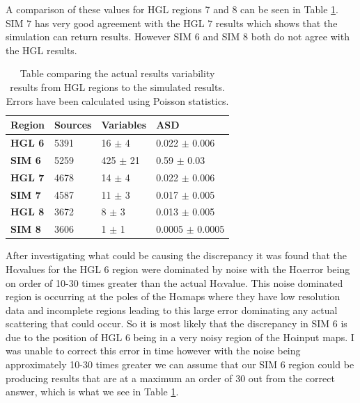 \documentclass[a4paper]{article}
\def\halpha{$\mathrm{H\alpha}$\;}
\begin{document}
A comparison of these values for HGL regions 7 and 8 can be seen in Table \ref{tab:HGLcomp}. SIM 7 has very good agreement with the HGL 7 results which shows that the simulation can return results. However SIM 6 and SIM 8 both do not agree with the HGL results. 
\begin{table}[H]
    \centering
\begin{tabular}{llll}
    \toprule
    \textbf{Region}	& \textbf{Sources}	&	\textbf{Variables}	&		\textbf{ASD}		\\ \midrule
    \textbf{HGL 6}	&   5391 &	16 $\pm$ 4  &	0.022 $\pm$ 0.006	\\
    \textbf{SIM 6}	&	5259 &  425 $\pm$ 21&	0.59  $\pm$ 0.03	\\\midrule
    \textbf{HGL 7}	&	4678 &	14 $\pm$ 4	&	0.022 $\pm$ 0.006	\\
    \textbf{SIM 7}	&	4587 &	11 $\pm$ 3	&	0.017 $\pm$ 0.005	\\\midrule
    \textbf{HGL 8}	&	3672 &	8 $\pm$ 3 	&	0.013 $\pm$ 0.005	\\
    \textbf{SIM 8}	&   3606 &	1 $\pm$ 1	&	0.0005 $\pm$ 0.0005	\\\bottomrule
\end{tabular}
    \caption{Table comparing the actual results variability results from HGL regions to the simulated results. Errors have been calculated using Poisson statistics.}
    \label{tab:HGLcomp}
\end{table}

After investigating what could be causing the discrepancy it was found that the \halpha values for the HGL 6 region were dominated by noise with the \halpha error being on order of 10-30 times greater than the actual \halpha value. This noise dominated region is occurring at the poles of the \halpha maps where they have low resolution data and incomplete regions leading to this large error dominating any actual scattering that could occur. So it is most likely that the discrepancy in SIM 6 is due to the position of HGL 6 being in a very noisy region of the \halpha input maps. I was unable to correct this error in time however with the noise being approximately 10-30 times greater we can assume that our SIM 6 region could be producing results that are at a maximum  an order of 30 out from the correct answer, which is what we see in Table \ref{tab:HGLcomp}.\\
\end{document}
